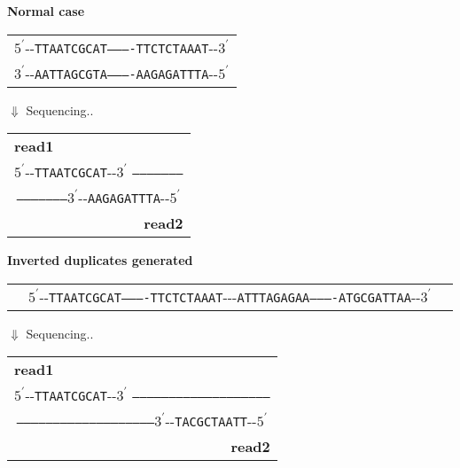 \documentclass[10pt]{article}
\newcommand{\DNA}[1]{\texttt{\uppercase{#1}}}
\begin{document}
\begin{center}
\center \textbf{Normal case} \\
\begin{tabular}{l}
\hline
$5^{\prime}$-{\color{red}{a1}}-\DNA{TTAATCGCAT----------TTCTCTAAAT}-{\color{green}{a2}}-$3^{\prime}$ \\	 
$3^{\prime}$-{\color{green}{a2}}-\DNA{AATTAGCGTA----------AAGAGATTTA}-{\color{red}{a1}}-$5^{\prime}$ \\
\hline
\end{tabular}
\center $\Downarrow$ Sequencing..\\
\begin{tabular}{lcr}
\hline
\textbf{read1} & & \\
\multicolumn{3}{c}{$5^{\prime}$-{\color{red}{a1}}-\DNA{TTAATCGCAT}-{\color{green}{a2}}-$3^{\prime}$
\DNA{--------------------}}\\	
\multicolumn{3}{c}{\DNA{--------------------}$3^{\prime}$-{\color{green}{a2}}-\DNA{AAGAGATTTA}-{\color{red}{a1}}-$5^{\prime}$ }\\
& & \textbf{read2} \\ 
\hline
\end{tabular}
\end{center}

\vspace{1cm}

\begin{center}
\center \textbf{Inverted duplicates generated}\\
\begin{tabular}{lll}
& $5^{\prime}$-{\color{red}{a1}}-\DNA{TTAATCGCAT----------TTCTCTAAAT}-{\color{green}{a2}}-{\color{red}{a1}}-\DNA{ATTTAGAGAA----------ATGCGATTAA}-{\color{green}{a2}}-$3^{\prime}$ & \\	
\end{tabular}
\center $\Downarrow$ Sequencing..\\
\begin{tabular}{lcr}
\hline
\textbf{read1} & & \\
\multicolumn{3}{c}{$5^{\prime}$-{\color{red}{a1}}-\DNA{TTAATCGCAT}-{\color{green}{a2}}-$3^{\prime}$
\DNA{--------------------------------------------------------}} \\	 
\multicolumn{3}{c}{\DNA{--------------------------------------------------------}$3^{\prime}$-{\color{green}{a2}}-\DNA{TACGCTAATT}-{\color{red}{a1}}-$5^{\prime}$}\\
& & \textbf{read2} \\ 
\hline
\end{tabular}
\end{center}
\end{document}
